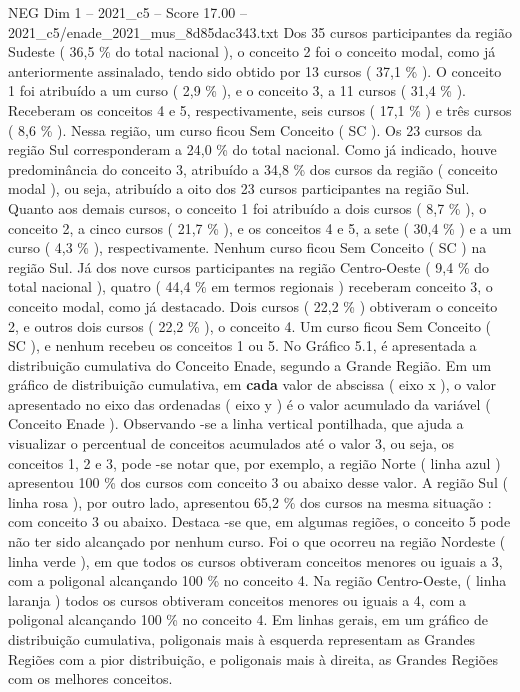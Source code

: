 \begin{textsample}{NEG Dim 1 – 2021\_c5 – Score 17.00 – 2021\_c5/enade\_2021\_mus\_8d85dac343.txt}
Dos 35 cursos participantes da região Sudeste ( 36,5 \% do total nacional ), o conceito 2 foi o conceito modal, como já anteriormente assinalado, tendo sido obtido por 13 cursos ( 37,1 \% ).
O conceito 1 foi atribuído a um curso ( 2,9 \% ), e o conceito 3, a 11 cursos ( 31,4 \% ).
Receberam os conceitos 4 e 5, respectivamente, seis cursos ( 17,1 \% ) e três cursos ( 8,6 \% ).
Nessa região, um curso ficou Sem Conceito ( SC ).
Os 23 cursos da região Sul corresponderam a 24,0 \% do total nacional.
Como já indicado, houve predominância do conceito 3, atribuído a 34,8 \% dos cursos da região ( conceito modal ), ou seja, atribuído a oito dos 23 cursos participantes na região Sul.
Quanto aos demais cursos, o conceito 1 foi atribuído a dois cursos ( 8,7 \% ), o conceito 2, a cinco cursos ( 21,7 \% ), e os conceitos 4 e 5, a sete ( 30,4 \% ) e a um curso ( 4,3 \% ), respectivamente.
Nenhum curso ficou Sem Conceito ( SC ) na região Sul.
Já dos nove cursos participantes na região Centro-Oeste ( 9,4 \% do total nacional ), quatro ( 44,4 \% em termos regionais ) receberam conceito 3, o conceito modal, como já destacado.
Dois cursos ( 22,2 \% ) obtiveram o conceito 2, e outros dois cursos ( 22,2 \% ), o conceito 4.
Um curso ficou Sem Conceito ( SC ), e nenhum recebeu os conceitos 1 ou 5.
No Gráfico 5.1, é apresentada a distribuição cumulativa do Conceito Enade, segundo a Grande Região.
Em um gráfico de distribuição cumulativa, em \textbf{cada} valor de abscissa ( eixo x ), o valor apresentado no eixo das ordenadas ( eixo y ) é o valor acumulado da variável ( Conceito Enade ).
Observando -se a linha vertical pontilhada, que ajuda a visualizar o percentual de conceitos acumulados até o valor 3, ou seja, os conceitos 1, 2 e 3, pode -se notar que, por exemplo, a região Norte ( linha azul ) apresentou 100 \% dos cursos com conceito 3 ou abaixo desse valor.
A região Sul ( linha rosa ), por outro lado, apresentou 65,2 \% dos cursos na mesma situação : com conceito 3 ou abaixo.
Destaca -se que, em algumas regiões, o conceito 5 pode não ter sido alcançado por nenhum curso.
Foi o que ocorreu na região Nordeste ( linha verde ), em que todos os cursos obtiveram conceitos menores ou iguais a 3, com a poligonal alcançando 100 \% no conceito 4.
Na região Centro-Oeste, ( linha laranja ) todos os cursos obtiveram conceitos menores ou iguais a 4, com a poligonal alcançando 100 \% no conceito 4.
Em linhas gerais, em um gráfico de distribuição cumulativa, poligonais mais à esquerda representam as Grandes Regiões com a pior distribuição, e poligonais mais à direita, as Grandes Regiões com os melhores conceitos.

\end{textsample}
